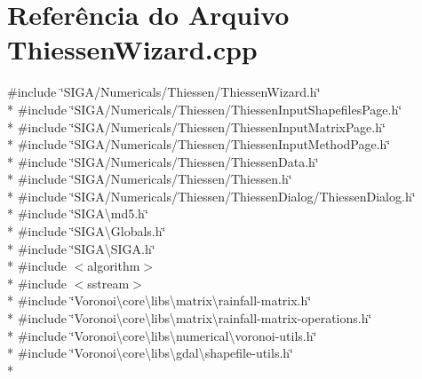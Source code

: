 \section{Referência do Arquivo Thiessen\+Wizard.\+cpp}
\label{_thiessen_wizard_8cpp}
{\ttfamily \#include \char`\"{}S\+I\+G\+A/\+Numericals/\+Thiessen/\+Thiessen\+Wizard.\+h\char`\"{}}\\*
{\ttfamily \#include \char`\"{}S\+I\+G\+A/\+Numericals/\+Thiessen/\+Thiessen\+Input\+Shapefiles\+Page.\+h\char`\"{}}\\*
{\ttfamily \#include \char`\"{}S\+I\+G\+A/\+Numericals/\+Thiessen/\+Thiessen\+Input\+Matrix\+Page.\+h\char`\"{}}\\*
{\ttfamily \#include \char`\"{}S\+I\+G\+A/\+Numericals/\+Thiessen/\+Thiessen\+Input\+Method\+Page.\+h\char`\"{}}\\*
{\ttfamily \#include \char`\"{}S\+I\+G\+A/\+Numericals/\+Thiessen/\+Thiessen\+Data.\+h\char`\"{}}\\*
{\ttfamily \#include \char`\"{}S\+I\+G\+A/\+Numericals/\+Thiessen/\+Thiessen.\+h\char`\"{}}\\*
{\ttfamily \#include \char`\"{}S\+I\+G\+A/\+Numericals/\+Thiessen/\+Thiessen\+Dialog/\+Thiessen\+Dialog.\+h\char`\"{}}\\*
{\ttfamily \#include \char`\"{}S\+I\+G\+A\textbackslash{}md5.\+h\char`\"{}}\\*
{\ttfamily \#include \char`\"{}S\+I\+G\+A\textbackslash{}\+Globals.\+h\char`\"{}}\\*
{\ttfamily \#include \char`\"{}S\+I\+G\+A\textbackslash{}\+S\+I\+G\+A.\+h\char`\"{}}\\*
{\ttfamily \#include $<$algorithm$>$}\\*
{\ttfamily \#include $<$sstream$>$}\\*
{\ttfamily \#include \char`\"{}Voronoi\textbackslash{}core\textbackslash{}libs\textbackslash{}matrix\textbackslash{}rainfall-\/matrix.\+h\char`\"{}}\\*
{\ttfamily \#include \char`\"{}Voronoi\textbackslash{}core\textbackslash{}libs\textbackslash{}matrix\textbackslash{}rainfall-\/matrix-\/operations.\+h\char`\"{}}\\*
{\ttfamily \#include \char`\"{}Voronoi\textbackslash{}core\textbackslash{}libs\textbackslash{}numerical\textbackslash{}voronoi-\/utils.\+h\char`\"{}}\\*
{\ttfamily \#include \char`\"{}Voronoi\textbackslash{}core\textbackslash{}libs\textbackslash{}gdal\textbackslash{}shapefile-\/utils.\+h\char`\"{}}\\*
